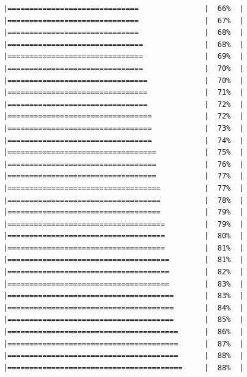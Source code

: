 \documentclass[
  krantz2]{krantz}
\begin{document}
\begin{verbatim}
|==============================               |  66%  |                                                     |==============================               |  67%  |                                                     |==============================               |  68%  |                                                     |===============================              |  68%  |                                                     |===============================              |  69%  |                                                     |===============================              |  70%  |                                                     |================================             |  70%  |                                                     |================================             |  71%  |                                                     |================================             |  72%  |                                                     |=================================            |  72%  |                                                     |=================================            |  73%  |                                                     |=================================            |  74%  |                                                     |==================================           |  75%  |                                                     |==================================           |  76%  |                                                     |==================================           |  77%  |                                                     |===================================          |  77%  |                                                     |===================================          |  78%  |                                                     |===================================          |  79%  |                                                     |====================================         |  79%  |                                                     |====================================         |  80%  |                                                     |====================================         |  81%  |                                                     |=====================================        |  81%  |                                                     |=====================================        |  82%  |                                                     |=====================================        |  83%  |                                                     |======================================       |  83%  |                                                     |======================================       |  84%  |                                                     |======================================       |  85%  |                                                     |=======================================      |  86%  |                                                     |=======================================      |  87%  |                                                     |=======================================      |  88%  |                                                     |========================================     |  88%  |                        
\end{verbatim}
\end{document}
